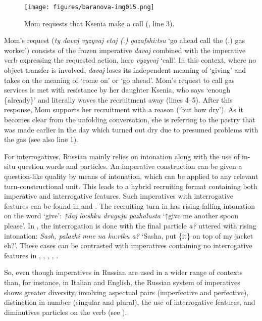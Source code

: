 \documentclass[output=paper,modfonts,nonflat]{langsci/langscibook}
\begin{document}
\begin{figure}
\texttt{[image: figures/baranova-img015.png]}
\caption{Mom requests that Ksenia make a call (, line 3).}
\label{fig:baranova:14}
\end{figure}

Mom's request (\textit{ty davaj vyzyvaj etaj (.) gazafshi:tsu} ‘go ahead call the (.) gas worker’) consists of the frozen imperative \textit{davaj} combined with the imperative verb expressing the requested action, here \textit{vyzyvaj} ‘call’. In this context, where no object transfer is involved, \textit{davaj} loses its independent meaning of ‘giving’ and takes on the meaning of ‘come on’ or ‘go ahead’. Mom’s request to call gas services is met with resistance by her daughter Ksenia, who says ‘enough \{already\}’ and literally waves the recruitment away (lines 4--5). After this response, Mom supports her recruitment with a reason (‘but how dry’). As it becomes clear from the unfolding conversation, she is referring to the pastry that was made earlier in the day which turned out dry due to presumed problems with the gas (see also line 1).

For interrogatives, Russian mainly relies on intonation along with the use of in-situ question words and particles. An imperative construction can be given a question-like quality by means of intonation, which can be applied to any relevant turn-constructional unit. This leads to a hybrid recruiting format containing both imperative and interrogative features. Such imperatives with interrogative features can be found in  and . The recruiting turn in  has rising-falling intonation on the word ‘give’: \textit{↑daj lo:shku druguju pazhalusta} ‘↑give me another spoon please’. In , the interrogation is done with the final particle \textit{a?} uttered with rising intonation: \textit{Sash, palazhi mne na ku:rtku a?} ‘Sasha, put \{it\} on top of my jacket eh?’. These cases can be contrasted with imperatives containing no interrogative features in , , , , .

So, even though imperatives in Russian are used in a wider range of contexts than, for instance, in Italian and English, the Russian system of imperatives shows greater diversity, involving aspectual pairs (imperfective and perfective), distinction in number (singular and plural), the use of interrogative features, and diminutives particles on the verb (see ).
\end{document}
